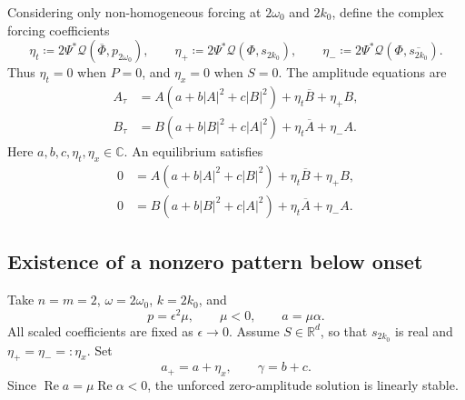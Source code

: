 \documentclass[11pt]{article}
\newcommand{\cQ}{\mathcal{Q}}
\DeclareMathOperator{\RePart}{Re}
\begin{document}
Considering only non-homogeneous forcing at $2\omega_0$ and $2k_0$, define
the complex forcing coefficients
\[
 \eta_t\coloneqq
 2\Psi^*\cQ\!\left(\overline\Phi,p_{2\omega_0}\right),
 \qquad
 \eta_+\coloneqq
 2\Psi^*\cQ\!\left(\Phi,s_{2k_0}\right), 
 \qquad
 \eta_-\coloneqq
 2\Psi^*\cQ\!\left(\Phi,\overline{s_{2k_0}}\right).
\]
Thus $\eta_t=0$ when $P=0$, and $\eta_x=0$ when $S=0$.  The amplitude
equations are
\begin{subequations}
\label{eq:amplitude}
\begin{align}
 A_\tau&=A\left(a+b|A|^2+c|B|^2\right)
          +\eta_t\overline B+\eta_+B,
 \label{eq:A}\\
 B_\tau&=B\left(a+b|B|^2+c|A|^2\right)
          +\eta_t\overline A+\eta_-A.
 \label{eq:B}
\end{align}
\end{subequations}
Here $a,b,c,\eta_t,\eta_x\in\mathbb C$.  An equilibrium satisfies
\begin{align}
 0&=A\left(a+b|A|^2+c|B|^2\right)
       +\eta_t\overline B+\eta_+B,
 \label{eq:A-equilibrium}\\
 0&=B\left(a+b|B|^2+c|A|^2\right)
       +\eta_t\overline A+\eta_-A.
 \label{eq:B-equilibrium}
\end{align}

\subsection{Existence of a nonzero pattern below onset}
Take $n=m=2$, $\omega=2\omega_0$, $k=2k_0$, and
\begin{equation}
 p=\epsilon^2\mu,\qquad \mu<0,\qquad a=\mu\alpha.
 \label{eq:below-onset-scale}
\end{equation}
All scaled coefficients are fixed as $\epsilon\to0$. Assume $S\in\mathbb R^d$,
so that $s_{2k_0}$ is real and $\eta_+=\eta_-=: \eta_x$.
Set
\begin{equation}
 a_+=a+\eta_x,\qquad \gamma=b+c.
 \label{eq:standing-coefficients}
\end{equation}
Since $\RePart a=\mu\RePart\alpha<0$, the unforced zero-amplitude
solution is linearly stable.
\end{document}
